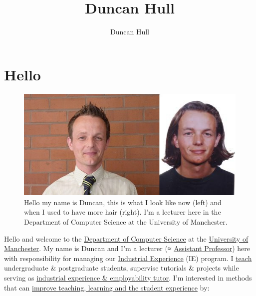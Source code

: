 \documentclass[
  12pt,
]{book}
\title{Duncan Hull}
\author{Duncan Hull}
\date{}
\begin{document}
\maketitle

{
\setcounter{tocdepth}{1}
\tableofcontents
}
\hypertarget{hello}{%
\chapter*{Hello}\label{hello}}

\begin{figure}

{\centering \includegraphics[width=0.66\linewidth]{images/duncan_hull} 

}

\caption{Hello my name is Duncan, this is what I look like now (left) and when I used to have more hair (right). I'm a lecturer here in the Department of Computer Science at the University of Manchester.}\label{fig:unsplashed-fig}
\end{figure}

Hello and welcome to the \href{https://www.cs.manchester.ac.uk/}{Department of Computer Science} at the \href{https://www.manchester.ac.uk}{University of Manchester}. My name is Duncan and I'm a lecturer (≈ \href{https://en.wikipedia.org/wiki/Assistant_professor}{Assistant Professor}) here with responsibility for managing our \href{https://www.cs.manchester.ac.uk/study/undergraduate/industrial-experience/}{Industrial Experience} (IE) program. I \href{https://personalpages.manchester.ac.uk/staff/duncan.hull/teaching.html}{teach} undergraduate \& postgraduate students, supervise tutorials \& projects while serving as \href{http://studentnet.cs.manchester.ac.uk/employment/placement/}{industrial experience \& employability tutor}. I'm interested in methods that can \href{https://personalpages.manchester.ac.uk/staff/duncan.hull/research.html}{improve teaching, learning and the student experience} by:
\end{document}
